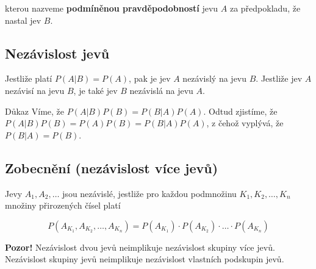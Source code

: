 		kterou nazveme \textbf{podmíněnou pravděpodobností} jevu $A$ za předpokladu, že nastal jev $B$.

		\subsection{Nezávislost jevů}
		Jestliže platí $P(A|B)=P(A)$, pak je jev $A$ nezávislý na jevu $B$. Jestliže jev $A$ nezávisí na jevu $B$, je také jev $B$ nezávislá na jevu $A$.

		\begin{note}{Důkaz}
			Víme, že $P(A|B)P(B) = P(B|A)P(A)$. Odtud zjistíme, že $P(A|B)P(B)=P(A)P(B)=P(B|A)P(A)$, z čehož vyplývá, že $P(B|A) = P(B)$.
		\end{note}

		\subsection{Zobecnění (nezávislost více jevů)}
		Jevy $A_1,A_2,\ldots$ jsou nezávislé, jestliže pro každou podmnožinu $K_1,K_2,\ldots,K_n$ množiny přirozených čísel platí

		\[ P(A_{K_1},A_{K_2},\ldots,A_{K_n}) = P(A_{K_1})\cdot P(A_{K_2})\cdot \ldots\cdot P(A_{K_n}) \]

		\textbf{Pozor!} Nezávislost dvou jevů neimplikuje nezávislost skupiny více jevů. Nezávislost skupiny jevů neimplikuje nezávislost vlastních podskupin jevů.